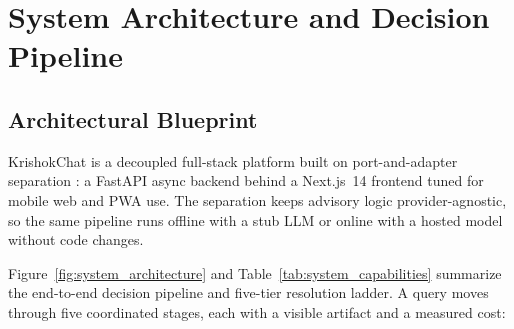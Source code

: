 \section{System Architecture and Decision Pipeline}
\label{sec:system_architecture}

\subsection{Architectural Blueprint}


KrishokChat is a decoupled full-stack platform built on port-and-adapter separation \citep{flexrag2025}: a FastAPI async backend behind a Next.js~14 frontend tuned for mobile web and PWA use. The separation keeps advisory logic provider-agnostic, so the same pipeline runs offline with a stub LLM or online with a hosted model without code changes.



Figure~\ref{fig:system_architecture} and Table~\ref{tab:system_capabilities} summarize the end-to-end decision pipeline and five-tier resolution ladder. A query moves through five coordinated stages, each with a visible artifact and a measured cost:

